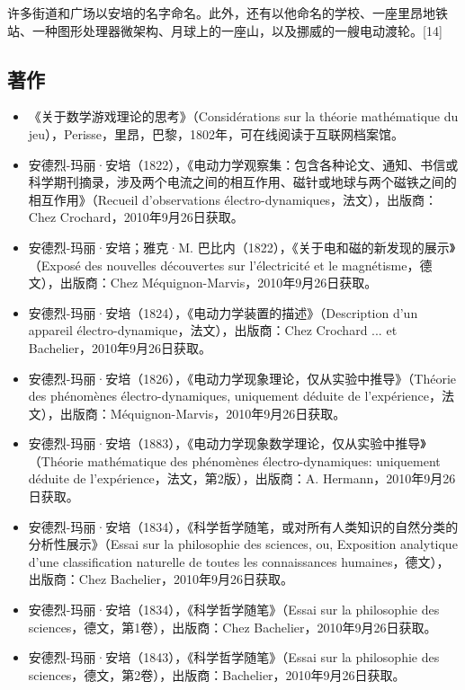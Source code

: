 许多街道和广场以安培的名字命名。此外，还有以他命名的学校、一座里昂地铁站、一种图形处理器微架构、月球上的一座山，以及挪威的一艘电动渡轮。[14]
\subsection{著作}

\begin{itemize}
\item 《关于数学游戏理论的思考》（Considérations sur la théorie mathématique du jeu），Perisse，里昂，巴黎，1802年，可在线阅读于互联网档案馆。
\item 安德烈-玛丽·安培（1822），《电动力学观察集：包含各种论文、通知、书信或科学期刊摘录，涉及两个电流之间的相互作用、磁针或地球与两个磁铁之间的相互作用》（Recueil d'observations électro-dynamiques，法文），出版商：Chez Crochard，2010年9月26日获取。
\item 安德烈-玛丽·安培；雅克·M. 巴比内（1822），《关于电和磁的新发现的展示》（Exposé des nouvelles découvertes sur l'électricité et le magnétisme，德文），出版商：Chez Méquignon-Marvis，2010年9月26日获取。
\item 安德烈-玛丽·安培（1824），《电动力学装置的描述》（Description d'un appareil électro-dynamique，法文），出版商：Chez Crochard ... et Bachelier，2010年9月26日获取。
\item 安德烈-玛丽·安培（1826），《电动力学现象理论，仅从实验中推导》（Théorie des phénomènes électro-dynamiques, uniquement déduite de l'expérience，法文），出版商：Méquignon-Marvis，2010年9月26日获取。
   \item 安德烈-玛丽·安培（1883），《电动力学现象数学理论，仅从实验中推导》（Théorie mathématique des phénomènes électro-dynamiques: uniquement déduite de l'expérience，法文，第2版），出版商：A. Hermann，2010年9月26日获取。

\item 安德烈-玛丽·安培（1834），《科学哲学随笔，或对所有人类知识的自然分类的分析性展示》（Essai sur la philosophie des sciences, ou, Exposition analytique d'une classification naturelle de toutes les connaissances humaines，德文），出版商：Chez Bachelier，2010年9月26日获取。
  \item 安德烈-玛丽·安培（1834），《科学哲学随笔》（Essai sur la philosophie des sciences，德文，第1卷），出版商：Chez Bachelier，2010年9月26日获取。
   \item 安德烈-玛丽·安培（1843），《科学哲学随笔》（Essai sur la philosophie des sciences，德文，第2卷），出版商：Bachelier，2010年9月26日获取。
\end{itemize}
